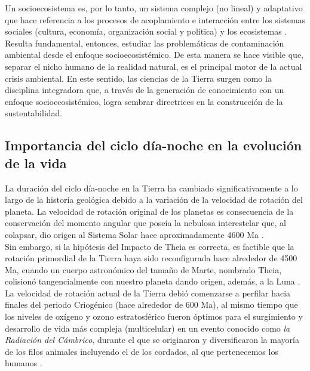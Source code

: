 Un socioecosistema es, por lo tanto, un sistema complejo (no lineal) y adaptativo que hace referencia a los procesos de acoplamiento e interacción entre los sistemas sociales (cultura, economía, organización social y política) y los ecosistemas \citep{Urquiza2015}.\\

Resulta fundamental, entonces, estudiar las problemáticas de contaminación ambiental desde el enfoque socioecosistémico. De esta manera se hace visible que, separar el nicho humano de la realidad natural, es el principal motor de la actual crisis ambiental. En este sentido, las ciencias de la Tierra surgen como la disciplina integradora que, a través de la generación de conocimiento con un enfoque socioecosistémico, logra sembrar directrices en la construcción de la sustentabilidad.\\

\subsection{Importancia del ciclo día-noche en la evolución de la vida}

La duración del ciclo día-noche en la Tierra ha cambiado significativamente a lo largo de la historia geológica debido a la variación de la velocidad de rotación del planeta. La velocidad de rotación original de los planetas  es consecuencia de la conservación del momento angular que poseía la nebulosa interestelar que, al colapsar, dio origen al Sistema Solar hace aproximadamente 4600 Ma \citep{Greaves2005}.\\

Sin embargo, si la hipótesis del Impacto de Theia es correcta, es factible que la rotación primordial de la Tierra haya sido reconfigurada hace alrededor de 4500 Ma, cuando un cuerpo astronómico del tamaño de Marte, nombrado Theia, colisionó tangencialmente con nuestro planeta dando origen, además, a la Luna \citep{Stevenson1987}.\\

La velocidad de rotación actual de la Tierra debió comenzarse a perfilar hacia finales del periodo Criogénico (hace alrededor de 600 Ma), al mismo tiempo que los niveles de oxígeno y ozono estratosférico fueron óptimos para el surgimiento y desarrollo de vida más compleja (multicelular) en un evento conocido como \textit{la Radiación del Cámbrico}, durante el que se originaron y diversificaron la mayoría de los filos animales incluyendo el de los cordados, al que pertenecemos los humanos \citep{Conway2000}.\\

